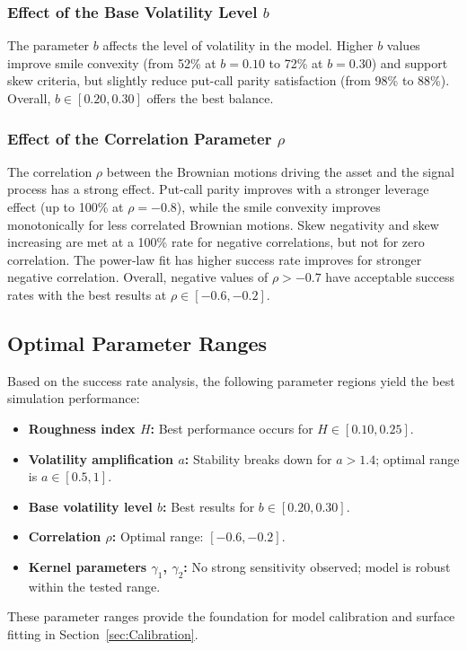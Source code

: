\subsubsection*{Effect of the Base Volatility Level \texorpdfstring{$b$}{b}}
The parameter $b$ affects the level of volatility in the model. Higher $b$ values improve smile convexity (from 52\% at $b = 0.10$ to 72\% at $b = 0.30$) and support skew criteria, but slightly reduce put-call parity satisfaction (from 98\% to 88\%). Overall, $b \in [0.20, 0.30]$ offers the best balance.

\subsubsection*{Effect of the Correlation Parameter \texorpdfstring{$\rho$}{rho}}
The correlation $\rho$ between the Brownian motions driving the asset and the signal process has a strong effect. Put-call parity improves with a stronger leverage effect (up to 100\% at $\rho = -0.8$), while the smile convexity improves monotonically for less correlated Brownian motions. Skew negativity and skew increasing are met at a 100\% rate for negative correlations, but not for zero correlation. The power-law fit has higher success rate improves for stronger negative correlation. Overall, negative values of $\rho > -0.7$ have acceptable success rates with the best results at $\rho \in [-0.6, -0.2]$.


\subsection{Optimal Parameter Ranges}

Based on the success rate analysis, the following parameter regions yield the best simulation performance:
\begin{itemize}
    \item \textbf{Roughness index $H$:} Best performance occurs for $H \in [0.10, 0.25]$.
    \item \textbf{Volatility amplification $a$:} Stability breaks down for $a > 1.4$; optimal range is $a \in [0.5, 1]$.
    \item \textbf{Base volatility level $b$:} Best results for $b \in [0.20, 0.30]$.
    \item \textbf{Correlation $\rho$:} Optimal range: $[-0.6, -0.2]$.
    \item \textbf{Kernel parameters $\gamma_1$, $\gamma_2$:} No strong sensitivity observed; model is robust within the tested range.
\end{itemize}
These parameter ranges provide the foundation for model calibration and surface fitting in Section~\ref{sec:Calibration}.

